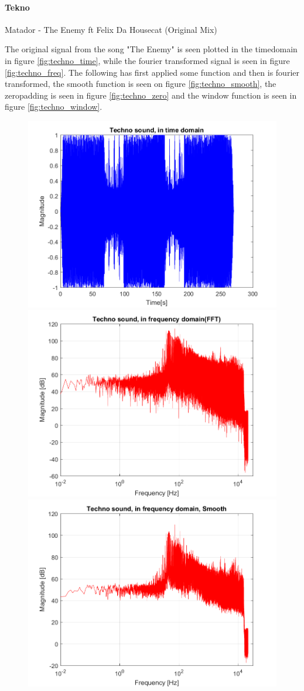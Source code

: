 \paragraph{Tekno}
Matador - The Enemy ft Felix Da Housecat (Original Mix)


The original signal from the song "The Enemy" is seen plotted in the timedomain in figure \ref{fig:techno_time}, while the fourier transformed signal is seen in figure \ref{fig:techno_freq}. The following has first applied some function and then is fourier transformed, the smooth function is seen on figure \ref{fig:techno_smooth}, the zeropadding is seen in figure \ref{fig:techno_zero} and the window function is seen in figure \ref{fig:techno_window}.

\begin{figure}[htb!]
	\centering
	{\includegraphics[width=0.45\linewidth]{code/Techno_figure1.png}}
	{\includegraphics[width=0.45\linewidth]{code/Techno_figure2.png}}
	{\includegraphics[width=0.45\linewidth]{code/Techno_figure3.png}}

\end{figure}
